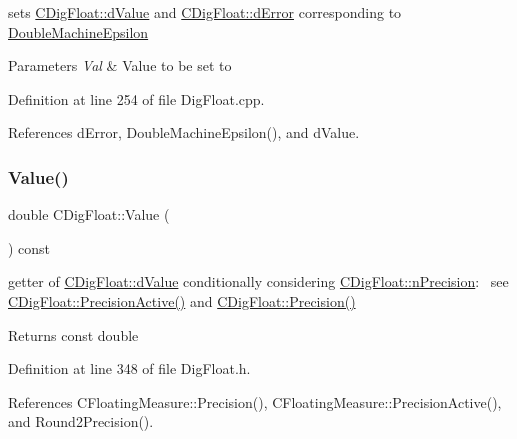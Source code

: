 sets \hyperlink{classCDigFloat_a4bbe69e30dd4e20527362493aa9aaf96}{C\+Dig\+Float\+::d\+Value} and \hyperlink{classCDigFloat_a25eb3782d1e727ff007a48f8308e3d4d}{C\+Dig\+Float\+::d\+Error} corresponding to \hyperlink{Utils_8h_ae9dfc174daaf6261f167ccc069efea93}{Double\+Machine\+Epsilon} 


\begin{DoxyParams}{Parameters}
{\em Val} & Value to be set to \\
\hline
\end{DoxyParams}


Definition at line 254 of file Dig\+Float.\+cpp.



References d\+Error, Double\+Machine\+Epsilon(), and d\+Value.

\mbox{\label{classCDigFloat_a51f185eb4ff3b24910c996739b6d5e9c}} 
\subsubsection{\texorpdfstring{Value()}{Value()}\hspace{0.1cm}{\footnotesize\ttfamily [2/2]}}
{\footnotesize\ttfamily double C\+Dig\+Float\+::\+Value (\begin{DoxyParamCaption}{ }\end{DoxyParamCaption}) const\hspace{0.3cm}{\ttfamily [inline]}}



getter of \hyperlink{classCDigFloat_a4bbe69e30dd4e20527362493aa9aaf96}{C\+Dig\+Float\+::d\+Value} conditionally considering \hyperlink{classCDigFloat_ad580654be35246d14c91482581c0bc11}{C\+Dig\+Float\+::n\+Precision}\+:~\newline
 see \hyperlink{classCDigFloat_ad1f2365630c9e35e77c01093e73440c4}{C\+Dig\+Float\+::\+Precision\+Active()} and \hyperlink{classCDigFloat_ad66e2fc1bb19f491dfbc4fb7bfb20d47}{C\+Dig\+Float\+::\+Precision()} 

\begin{DoxyReturn}{Returns}
const double 
\end{DoxyReturn}


Definition at line 348 of file Dig\+Float.\+h.



References C\+Floating\+Measure\+::\+Precision(), C\+Floating\+Measure\+::\+Precision\+Active(), and Round2\+Precision().

